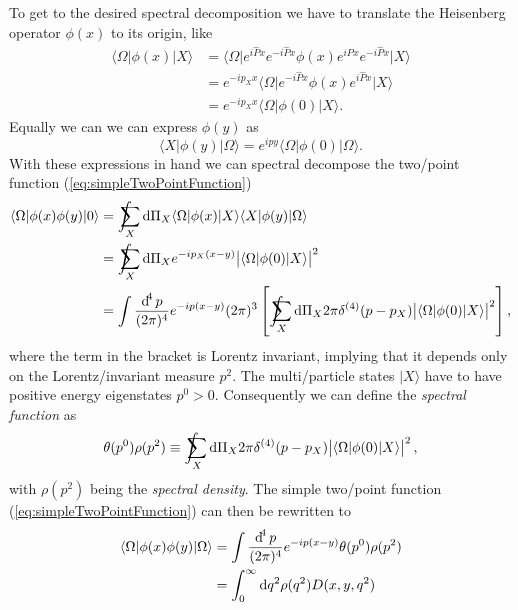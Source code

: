 \documentclass[../../index.tex]{subfiles}
\begin{document}
To get to the desired spectral decomposition we have to translate the Heisenberg
operator $\phi(x)$ to its origin, like
\begin{equation}
  \begin{split}
    \langle \Omega \vert \phi(x) \vert X \rangle
    &=  \langle \Omega \vert e^{i \hat P x}e^{-i \hat P x} \phi(x) e^{i \hat P x}e^{-i \hat P x} \vert X \rangle \\
    &= e^{-i p_X x} \langle \Omega \vert e^{-i \hat P x} \phi(x) e^{i \hat P x} \vert X \rangle \\
    &= e^{-i p_X x} \langle \Omega \vert \phi(0) \vert X \rangle.
  \end{split}
\end{equation}
Equally we can we can express $\phi(y)$ as
\begin{equation}
  \langle X \vert \phi(y) \vert \Omega \rangle = e^{ipy} \langle \Omega \vert \phi(0) \vert \Omega \rangle.
\end{equation}
With these expressions in hand we can spectral decompose the two\-/point
function (\cref{eq:simpleTwoPointFunction})
\begin{equation}
  \begin{split}
    \langle \Omega \vert \phi(x) \phi(y) \vert 0 \rangle
    &= \intsum_X \dif \Pi_X \langle \Omega \vert \phi(x) \vert X \rangle \langle X \vert \phi(y) \vert \Omega \rangle \\
    &= \intsum_X \dif \Pi_X e^{-i p_X (x-y)} \abs{\langle \Omega \vert \phi(0) \vert X \rangle}^2  \\
    &= \int \frac{\dif^4 p}{(2\pi)^4} e^{-i p (x-y)} (2\pi)^3 \left[ \intsum_X
      \dif \Pi_X 2\pi \delta^{(4)}(p-p_X) \abs{\langle \Omega \vert \phi(0)
        \vert X \rangle}^2 \right],
  \end{split}
\end{equation}
where the term in the bracket is Lorentz invariant, implying that it depends
only on the Lorentz\-/invariant measure $p^2$. The multi\-/particle states
$\vert X \rangle$ have to have positive energy eigenstates $p^0 > 0$.
Consequently we can define the \textit{spectral function} as
\begin{equation}
  \theta(p^0) \rho(p^2) \equiv \intsum_X \dif \Pi_X  2\pi \delta^{(4)}(p-p_X) \abs{\langle \Omega \vert \phi(0) \vert X \rangle}^2,
\end{equation}
with $\rho(p^2)$ being the \textit{spectral density}. The simple two\-/point
function (\cref{eq:simpleTwoPointFunction}) can then be rewritten to
\begin{equation}
  \begin{split}
    \langle \Omega \vert \phi(x) \phi(y) \vert \Omega \rangle &= \int \fdif{p} e^{-i p(x-y)} \theta(p^0) \rho(p^2) \\
    &= \int_0^\infty \dif q^2 \rho(q^2) D(x, y, q^2)
  \end{split}
\end{equation}
\end{document}
